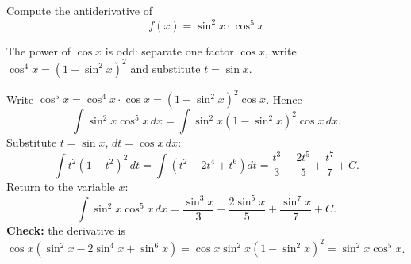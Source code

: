 
\begin{question}
Compute the antiderivative of
\[ f(x)=\sin^2x\cdot\cos^5x \]
\end{question}

\begin{hint}
The power of $\cos x$ is odd: separate one factor $\cos x$, write $\cos^4x=(1-\sin^2x)^2$ and substitute $t=\sin x$.
\end{hint}

\begin{solution}
Write $\cos^5x=\cos^4x\cdot\cos x=(1-\sin^2x)^2\cos x$. Hence
\[ \int\sin^2x\cos^5x\,dx=\int\sin^2x(1-\sin^2x)^2\cos x\,dx. \]
Substitute $t=\sin x$, $dt=\cos x\,dx$:
\[ \int t^2(1-t^2)^2\,dt=\int\left(t^2-2t^4+t^6\right)dt=\frac{t^3}3-\frac{2t^5}5+\frac{t^7}7+C. \]
Return to the variable $x$:
\[ \boxed{\int\sin^2x\cos^5x\,dx=\frac{\sin^3x}{3}-\frac{2\sin^5x}{5}+\frac{\sin^7x}{7}+C}. \]
\textbf{Check:} the derivative is $\cos x\left(\sin^2x-2\sin^4x+\sin^6x\right)=\cos x\sin^2x(1-\sin^2x)^2=\sin^2x\cos^5x$.
\end{solution}
